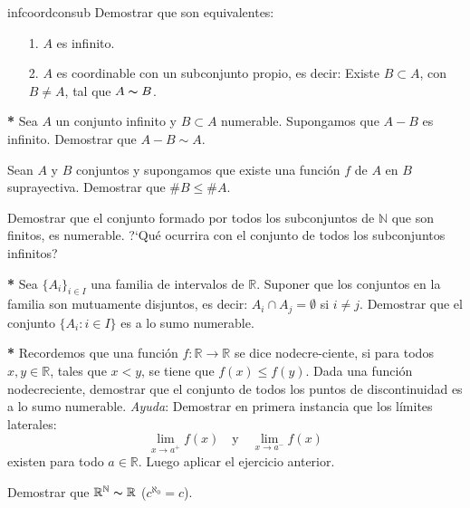 \documentclass{book}
\newcommand{\rr}{\mathbb{R}}
\newcommand{\nn}{\mathbb{N}}
\begin{document}
\begin{ejer}{infcoordconsub} Demostrar que son
equivalentes:
\begin{itemize}
     \item[1.] $A$ es infinito.
     \item[2.] $A$ es coordinable con un subconjunto propio, es
     decir: Existe $B\subset A$, con $B\neq A$, tal que
     $A\thicksim B$.
\end{itemize}
\end{ejer}

\begin{ejer}{}\textbf{*} Sea $A$ un conjunto infinito y $B\subset A$ 
 numerable. Supongamos que $A-B$ es infinito. Demostrar que
$A-B\sim A$.
\end{ejer}




\begin{ejer}{} Sean $A$ y $B$ conjuntos y supongamos que existe
una función  $f$ de $A$ en $B$ suprayectiva. Demostrar que $\#
B\leq \#A$.
\end{ejer}

\begin{ejer}{} Demostrar que el conjunto formado por todos los
subconjuntos de $\nn$ que son finitos, es numerable.
?`Qué ocurrira con el conjunto de todos los subconjuntos
infinitos?
\end{ejer}

\begin{ejer}{}\textbf{*}  Sea $\{A_i\}_{i\in I}$ una familia de intervalos
de $\rr$. Suponer que los conjuntos en la familia son mutuamente
disjuntos, es decir: $A_i\cap A_j=\emptyset$ si $i\neq j$.
Demostrar que el conjunto $\{A_i:i\in I\}$ es a lo sumo numerable.
\end{ejer}

\begin{ejer}{}\textbf{*}  Recordemos que una función
$f:\rr\longrightarrow\rr$ se dice nodecre-\newline ciente, si para
todos $x,y\in\rr$, tales que $x<y$, se tiene que $f(x)\leq f(y)$.
Dada una función nodecreciente, demostrar que el conjunto de
todos los puntos de discontinuidad es a lo sumo numerable.
\textit{Ayuda}: Demostrar en primera instancia que los
límites laterales:
\[
    \lim\limits_{x\rightarrow a^+}f(x)\quad\text{y}\quad \lim\limits_{x\rightarrow
    a^-}f(x)
\]
existen para todo $a\in\rr$. Luego aplicar el ejercicio anterior.
\end{ejer}

\begin{ejer}{} Demostrar que $\rr^{\nn}\thicksim\rr$ ($c^{\aleph_0}=c$).
\end{ejer}
\end{document}
